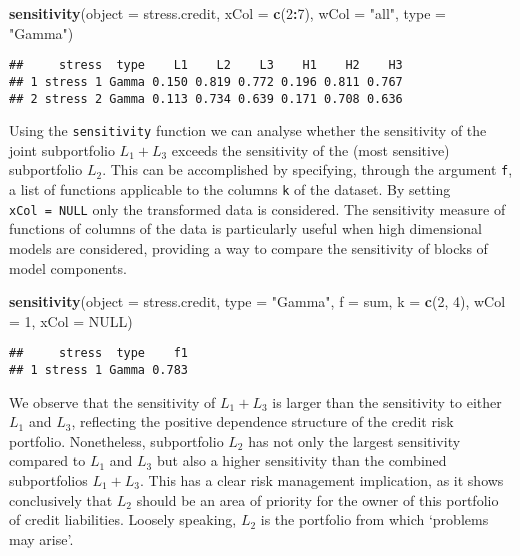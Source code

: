 \documentclass[
]{article}
\newenvironment{Shaded}{\begin{snugshade}}{\end{snugshade}}
\newcommand{\DataTypeTok}[1]{\textcolor[rgb]{0.13,0.29,0.53}{#1}}
\newcommand{\DecValTok}[1]{\textcolor[rgb]{0.00,0.00,0.81}{#1}}
\newcommand{\KeywordTok}[1]{\textcolor[rgb]{0.13,0.29,0.53}{\textbf{#1}}}
\newcommand{\NormalTok}[1]{#1}
\newcommand{\OperatorTok}[1]{\textcolor[rgb]{0.81,0.36,0.00}{\textbf{#1}}}
\newcommand{\OtherTok}[1]{\textcolor[rgb]{0.56,0.35,0.01}{#1}}
\newcommand{\StringTok}[1]{\textcolor[rgb]{0.31,0.60,0.02}{#1}}
\begin{document}
\begin{Shaded}
\begin{Highlighting}[]
\KeywordTok{sensitivity}\NormalTok{(}\DataTypeTok{object =}\NormalTok{ stress.credit, }\DataTypeTok{xCol =} \KeywordTok{c}\NormalTok{(}\DecValTok{2}\OperatorTok{:}\DecValTok{7}\NormalTok{), }\DataTypeTok{wCol =} \StringTok{"all"}\NormalTok{, }\DataTypeTok{type =} \StringTok{"Gamma"}\NormalTok{)}
\end{Highlighting}
\end{Shaded}

\begin{verbatim}
##     stress  type    L1    L2    L3    H1    H2    H3
## 1 stress 1 Gamma 0.150 0.819 0.772 0.196 0.811 0.767
## 2 stress 2 Gamma 0.113 0.734 0.639 0.171 0.708 0.636
\end{verbatim}

Using the \texttt{sensitivity} function we can analyse whether the sensitivity of the joint subportfolio \(L_1 + L_3\) exceeds the sensitivity of the (most sensitive) subportfolio \(L_2\). This can be accomplished by specifying, through the argument \texttt{f}, a list of functions applicable to the columns \texttt{k} of the dataset. By setting \texttt{xCol\ =\ NULL} only the transformed data is considered. The sensitivity measure of functions of columns of the data is particularly useful when high dimensional models are considered, providing a way to compare the sensitivity of blocks of model components.

\begin{Shaded}
\begin{Highlighting}[]
\KeywordTok{sensitivity}\NormalTok{(}\DataTypeTok{object =}\NormalTok{ stress.credit, }\DataTypeTok{type =} \StringTok{"Gamma"}\NormalTok{, }\DataTypeTok{f =}\NormalTok{ sum, }\DataTypeTok{k =} \KeywordTok{c}\NormalTok{(}\DecValTok{2}\NormalTok{, }\DecValTok{4}\NormalTok{), }
    \DataTypeTok{wCol =} \DecValTok{1}\NormalTok{, }\DataTypeTok{xCol =} \OtherTok{NULL}\NormalTok{)}
\end{Highlighting}
\end{Shaded}

\begin{verbatim}
##     stress  type    f1
## 1 stress 1 Gamma 0.783
\end{verbatim}

We observe that the sensitivity of \(L_1 + L_3\) is larger than the sensitivity to either \(L_1\) and \(L_3\), reflecting the positive dependence structure of the credit risk portfolio. Nonetheless, subportfolio \(L_2\) has not only the largest sensitivity compared to \(L_1\) and \(L_3\) but also a higher sensitivity than the combined subportfolios \(L_1 + L_3\). This has a clear risk management implication, as it shows conclusively that \(L_2\) should be an area of priority for the owner of this portfolio of credit liabilities. Loosely speaking, \(L_2\) is the portfolio from which `problems may arise'.
\end{document}
